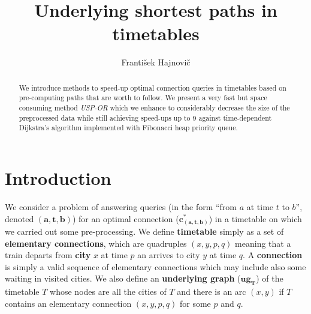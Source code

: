 \documentclass{svk_long_en}
\begin{document}
    \title{Underlying shortest paths in timetables}
	\author{František Hajnovič
	}
	
	
	

	\maketitle

	\begin{abstract}
	We introduce methods to speed-up optimal connection queries in timetables based on pre-computing paths that are worth to follow. We present a very fast but space consuming method \textit{USP-OR} which we enhance to considerably decrease the size of the preprocessed data while still achieving speed-ups up to 9 against time-dependent Dijkstra's algorithm implemented with Fibonacci heap priority queue.
	\end{abstract}

    
\section{Introduction}

	We consider a problem of answering queries (in the form ``from $a$ at time $t$ to $b$'', denoted $\bm{(a, t, b)}$) for an optimal connection ($\bm{c^{*}_{(a, t, b)}}$) in a timetable on which we carried out some pre-processing. We define \textbf{timetable} simply as a set of \textbf{elementary connections}, which are quadruples $(x, y, p, q)$ meaning that a train departs from \textbf{city} $x$ at time $p$ an arrives to city $y$ at time $q$. A \textbf{connection} is simply a valid sequence of elementary connections which may include also some waiting in visited cities. We also define an \textbf{underlying graph} ($\bm{ug_{T}}$) of the timetable $T$ whose nodes are all the cities of $T$ and there is an arc $(x, y)$ if $T$ contains an elementary connection $(x, y, p, q)$ for some $p$ and $q$.
\end{document}
